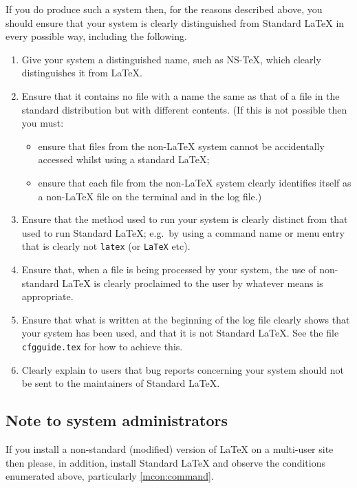 \documentclass{ltxguide}[1995/11/28]
\newcommand{\nstex}{\textsf{NS-TeX}}
\begin{document}
If you do produce such a system then, for the reasons described
above, you should ensure that your system is clearly distinguished
from Standard \LaTeX{} in every possible way, including the following.


\begin{enumerate}
\item
  Give your system a distinguished name, such as \nstex, which clearly
  distinguishes it from \LaTeX{}.

\item
  Ensure that it contains no file with a name the same as that of
  a file in the standard distribution but with different contents.
  (If this is not possible then you must:
  \begin{itemize}
  \item
    ensure that files from the non-\LaTeX{} system cannot be
    accidentally accessed whilst using a standard \LaTeX{};
  \item ensure that each file from the non-\LaTeX{} system clearly
    identifies itself as a non-\LaTeX{} file on the terminal and in the
    log file.)
  \end{itemize}

\item
  Ensure that the method used to run your system is clearly
\label{mcon:command}
  distinct from that used to run Standard \LaTeX; e.g.~by using a
  command name or menu entry that is clearly not \texttt{latex}
  (or \texttt{LaTeX} etc).

\item
  Ensure that, when a file is being processed by your system, the
  use of non-standard \LaTeX{} is clearly proclaimed to the user by
  whatever means is appropriate.

\item Ensure that what is written at the beginning of the log file
  clearly shows that your system has been used, and that it is
  not Standard \LaTeX{}.
  See the file \texttt{cfgguide.tex} for how to achieve this.

\item
 Clearly explain to users that bug reports concerning your
 system should not be sent to the maintainers of Standard
 \LaTeX{}.
\end{enumerate}

\subsection*{Note to system administrators}

If you install a non-standard (modified) version of \LaTeX{} on a
multi-user site then please, in addition, install Standard \LaTeX{}
and observe the conditions enumerated above, particularly
\ref{mcon:command}.
\end{document}
